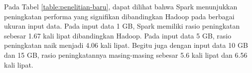 Pada Tabel \ref{table:penelitian-baru}, dapat dilihat bahwa Spark menunjukkan peningkatan performa yang signifikan dibandingkan Hadoop pada berbagai ukuran input data. Pada input data 1 GB, Spark memiliki rasio peningkatan sebesar 1.67 kali lipat dibandingkan Hadoop. Pada input data 5 GB, rasio peningkatan naik menjadi 4.06 kali lipat. Begitu juga dengan input data 10 GB dan 15 GB, rasio peningkatannya masing-masing sebesar 5.6 kali lipat dan 6.56 kali lipat.



